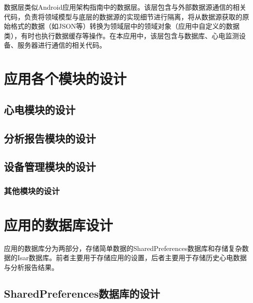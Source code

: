 数据层类似Android应用架构指南中的数据层。该层包含与外部数据源通信的相关代码，负责将领域模型与底层的数据源的实现细节进行隔离，将从数据源获取的原始格式的数据（如JSON等）转换为领域层中的领域对象（应用中自定义的数据类），有时也执行数据缓存等操作。在本应用中，该层包含与数据库、心电监测设备、服务器进行通信的相关代码。


\section{应用各个模块的设计}\label{sec:app-design}

\subsection{心电模块的设计}\label{subsec:ecg-design}


\subsection{分析报告模块的设计}\label{subsec:analytics-design}


\subsection{设备管理模块的设计}\label{subsec:device-design}


\subsubsection{其他模块的设计}\label{subsubsec:other-design}



\section{应用的数据库设计}\label{sec:db-design}

应用的数据库分为两部分，存储简单数据的SharedPreferences数据库和存储复杂数据的Isar数据库。前者主要用于存储应用的设置，后者主要用于存储历史心电数据与分析报告结果。

\subsection{SharedPreferences数据库的设计}\label{subsec:shared-preferences}

